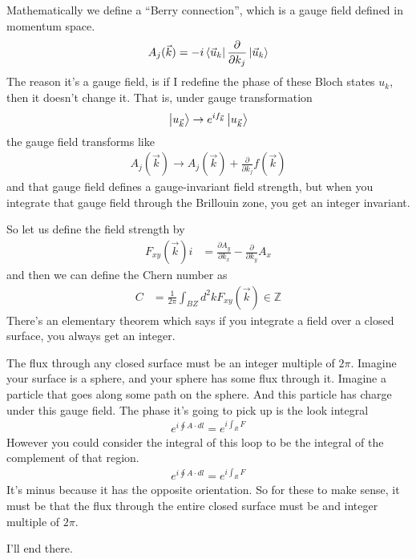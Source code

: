 Mathematically we define a ``Berry connection'',
which is a gauge field defined in momentum space.
\begin{align}
    A_j(\vec{k}) =
    -i \bra{\vec{u}_k}
    \frac{\partial}{\partial k_j} \ket{\vec{u}_k}
\end{align}
The reason it's a gauge field,
is if I redefine the phase of these Bloch states $u_k$,
then it doesn't change it.
That is,
under gauge transformation
\begin{align}
    \ket{u_{\vec{k}}}
    \to
    e^{i f_{\vec{k}}}\ket{u_{\vec{k}}}
\end{align}
the gauge field transforms like
\begin{align}
    A_j(\vec{k})
    \to
    A_j(\vec{k})
    + \frac{\partial}{\partial k_j} f(\vec{k})
\end{align}
and that gauge field defines a gauge-invariant field strength,
but when you integrate that gauge field through the Brillouin zone,
you get an integer invariant.

So let us define the field strength by
\begin{align}
    F_{xy}(\vec{k})i &=
    \frac{\partial A_y}{\partial k_x}
    - \frac{\partial}{\partial k_y}A_x
\end{align}
and then we can define the Chern number as
\begin{align}
    C &=
    \frac{1}{2\pi} \int_{BZ} d^2 k F_{xy}(\vec{k})
    \in \mathbb{Z}
\end{align}
There's an elementary theorem which says if you integrate a field over a closed
surface, 
you always get an integer.

The flux through any closed surface must be an integer multiple of $2\pi$.
Imagine your surface is a sphere,
and your sphere has some flux through it.
Imagine a particle that goes along some path on the sphere.
And this particle has charge under this gauge field.
The phase it's going to pick up is the look integral
\begin{align}
    e^{i\oint A\cdot dl} =
    e^{i\int_R F}
\end{align}
However you could consider the integral of this loop to be the integral of the
complement of that region.
\begin{align}
    e^{i\oint A\cdot dl} =
    e^{i\int_R F}
\end{align}
It's minus because it has the opposite orientation.
So for these to make sense,
it must be that the flux through the entire closed surface must be 
and integer multiple of $2\pi$.

I'll end there.
